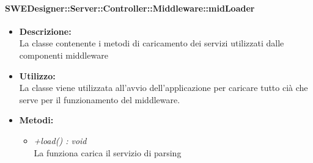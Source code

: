       \paragraph{SWEDesigner::Server::Controller::Middleware::midLoader}
        \begin{itemize}
          \item \textbf{Descrizione: }\\
          La classe contenente i metodi di caricamento dei servizi utilizzati dalle componenti middleware
          \item \textbf{Utilizzo: }\\
          La classe viene utilizzata all'avvio dell'applicazione per caricare tutto cià che serve per il funzionamento del middleware.
          \item \textbf{Metodi:}\\
          \begin{itemize}
            \item \emph{+load() : void}\\
            La funziona carica il servizio di parsing
          \end{itemize}
        \end{itemize}
